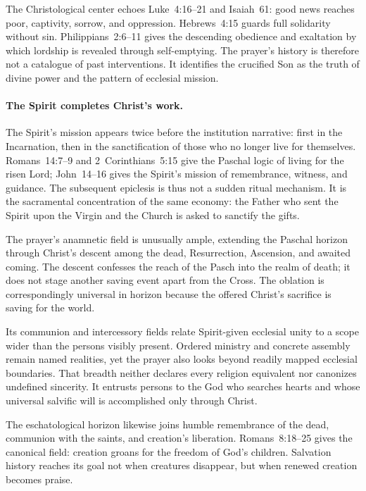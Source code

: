 The Christological center echoes Luke~4:16--21 and Isaiah~61: good news reaches poor, captivity, sorrow, and oppression. Hebrews~4:15 guards full solidarity without sin. Philippians~2:6--11 gives the descending obedience and exaltation by which lordship is revealed through self-emptying. The prayer's history is therefore not a catalogue of past interventions. It identifies the crucified Son as the truth of divine power and the pattern of ecclesial mission.

\paragraph{The Spirit completes Christ's work.}
The Spirit's mission appears twice before the institution narrative: first in the Incarnation, then in the sanctification of those who no longer live for themselves. Romans~14:7--9 and 2~Corinthians~5:15 give the Paschal logic of living for the risen Lord; John~14--16 gives the Spirit's mission of remembrance, witness, and guidance. The subsequent epiclesis is thus not a sudden ritual mechanism. It is the sacramental concentration of the same economy: the Father who sent the Spirit upon the Virgin and the Church is asked to sanctify the gifts.

The prayer's anamnetic field is unusually ample, extending the Paschal horizon through Christ's descent among the dead, Resurrection, Ascension, and awaited coming. The descent confesses the reach of the Pasch into the realm of death; it does not stage another saving event apart from the Cross. The oblation is correspondingly universal in horizon because the offered Christ's sacrifice is saving for the world.

Its communion and intercessory fields relate Spirit-given ecclesial unity to a scope wider than the persons visibly present. Ordered ministry and concrete assembly remain named realities, yet the prayer also looks beyond readily mapped ecclesial boundaries. That breadth neither declares every religion equivalent nor canonizes undefined sincerity. It entrusts persons to the God who searches hearts and whose universal salvific will is accomplished only through Christ.

The eschatological horizon likewise joins humble remembrance of the dead, communion with the saints, and creation's liberation. Romans~8:18--25 gives the canonical field: creation groans for the freedom of God's children. Salvation history reaches its goal not when creatures disappear, but when renewed creation becomes praise.


